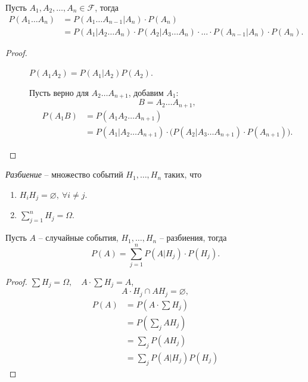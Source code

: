 \begin{theorem}
  Пусть $A_1,A_2,\ldots,A_n \in \mathcal{F}$, тогда
  \begin{align*}
    P(A_1 \ldots A_n) &=P(A_1 \ldots A_{n-1}|A_n)\cdot P(A_n) \\
    &=P(A_1|A_2 \ldots A_n)\cdot P(A_2|A_3 \ldots A_n)\cdot \ldots \cdot P(A_{n-1}|A_n)\cdot P(A_n).
  \end{align*}
\end{theorem}

\begin{proof}\leavevmode
  \begin{description}
    \item[] $P(A_1A_2) = P(A_1 | A_2)P(A_2)$.
    \item[] Пусть верно для $A_2 \ldots A_{n+1}$, добавим $A_1$:
    \[
      B = A_2 \ldots A_{n+1},
    \]
    \begin{align*}
      P(A_1B) &= P(A_1A_2 \ldots A_{n+1}) \\
      &= P(A_1|A_2 \ldots A_{n+1})\cdot \big(P(A_2|A_3 \ldots A_{n+1})\cdot P(A_{n+1})\big).
    \end{align*}
  \end{description}
\end{proof}

\begin{definition}[Разбиение]
  \emph{Разбиение} -- множество событий $H_1,\ldots,H_n$ таких, что
  \begin{enumerate}
    \item $H_iH_j = \varnothing, \ \forall i \ne j$.
    \item $\sum_{j=1}^{n}H_j = \Omega$.
  \end{enumerate}
\end{definition}

\begin{theorem}
  Пусть $A$ -- случайные события, $H_1,\ldots,H_n$ -- разбиения, тогда
  \[
    P(A) = \sum_{j=1}^{n}P(A|H_j)\cdot P(H_j).
  \]
\end{theorem}

\begin{proof}
  $\sum H_j = \Omega, \quad A \cdot \sum H_j = A$,
  \[
    A \cdot H_j \cap AH_j = \varnothing,
  \]
  \begin{align*}
    P(A) &= P\left(A \cdot \sum H_j\right) \\
    &= P\left(\sum_{j}A H_j\right) \\
    &= \sum_{j}P(AH_j) \\
    &= \sum_{j}P(A|H_j)P(H_j)
  \end{align*}
\end{proof}

